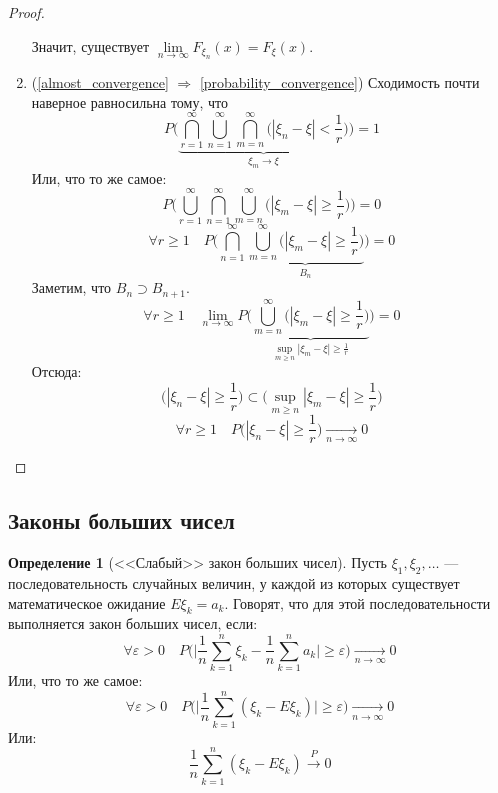 \documentclass[11pt,openany,a4paper]{scrartcl}
\theoremstyle{plain}
\theoremstyle{definition}
\newtheorem{definition}[theorem]{Определение}
\newcommand{\underto}[1]{\xrightarrow[#1]{}}
\newcommand{\overto}[1]{\xrightarrow{#1}}
\begin{document}
\begin{proof}
\begin{enumerate}
        Значит, существует $\lim\limits_{n \to \infty} F_{\xi_n}(x) = F_\xi(x)$.
        \item
        (\ref{almost_convergence} $\Rightarrow$ 
        \ref{probability_convergence})
        Сходимость почти наверное равносильна тому, что
        $$
        P\bigg(\underbrace{\bigcap_{r=1}^\infty\bigcup_{n=1}^\infty
        \bigcap_{m=n}^\infty
        \Big(|\xi_n - \xi| < \frac{1}{r}\Big)}_{\xi_m \to \xi}\bigg) = 1
        $$
        Или, что то же самое:
        $$
        P\bigg(\bigcup_{r=1}^\infty\bigcap_{n=1}^\infty\bigcup_{m=n}^\infty
        \Big(|\xi_m - \xi| \geqslant \frac{1}{r}\Big)\bigg) = 0
        $$
        $$
        \forall r\geqslant 1\quad
        P\bigg(\bigcap_{n=1}^\infty\underbrace{\bigcup_{m=n}^\infty\Big(|\xi_m - \xi| 
        \geqslant \frac{1}{r}\Big)}_{B_n}\bigg) = 0
        $$
        Заметим, что $B_n \supset B_{n+1}$.
        $$
        \forall r\geqslant1\quad
        \lim\limits_{n \to \infty}P\bigg(\underbrace{\bigcup_{m=n}^\infty
        \Big(|\xi_m - \xi| 
        \geqslant \frac{1}{r}\Big)}_{\sup\limits_{m \geqslant n} |\xi_m - \xi| \geqslant
        \frac{1}{r}}\bigg) = 0
        $$
        Отсюда:
        $$
        \Big(|\xi_n - \xi| \geqslant \frac{1}{r}\Big) \subset
        \Big(\sup\limits_{m\geqslant n} |\xi_m - \xi| \geqslant \frac{1}{r}\Big)
        $$
        $$
        \forall r\geqslant 1\quad
        P\Big(|\xi_n - \xi| \geqslant \frac{1}{r}\Big) \underto{n \to \infty} 0
        $$
    \end{enumerate}
\end{proof}

\subsection{Законы больших чисел}

\begin{definition}[<<Слабый>> закон больших чисел]
    Пусть $\xi_1, \xi_2,\ldots$ — последовательность случайных величин, у каждой
    из которых существует математическое ожидание $E\xi_k = a_k$. Говорят,
    что для этой последовательности выполняется закон больших чисел, если:
    $$
    \forall \varepsilon > 0\quad
    P\bigg(\bigg|\frac{1}{n}\sum\limits_{k=1}^n \xi_k -
    \frac{1}{n}\sum\limits_{k=1}^na_k\bigg| \geqslant \varepsilon \bigg)
    \underto{n \to \infty} 0
    $$
    Или, что то же самое:
    $$
    \forall \varepsilon > 0\quad
    P\bigg(\bigg|\frac{1}{n}\sum\limits_{k=1}^n(\xi_k - E\xi_k)\bigg|\geqslant 
    \varepsilon\bigg) \underto{n \to \infty} 0
    $$
    Или:
    $$
    \frac{1}{n}\sum\limits_{k=1}^n(\xi_k - E\xi_k) \overto{P} 0
    $$
\end{definition}
\end{document}
